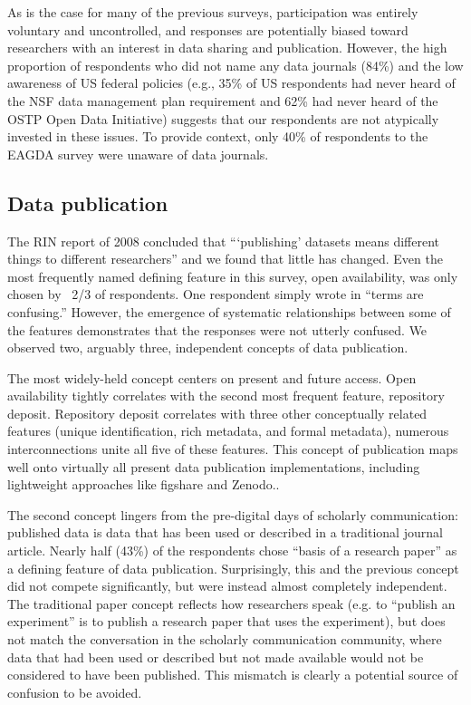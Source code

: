 \documentclass[10pt]{article}
\begin{document}
As is the case for many of the previous surveys, participation was entirely voluntary and uncontrolled, and responses are potentially biased toward researchers with an interest in data sharing and publication.
However, the high proportion of respondents who did not name any data journals (84\%) and the low awareness of US federal policies (e.g., 35\% of US respondents had never heard of the NSF data management plan requirement and 62\% had never heard of the OSTP Open Data Initiative) suggests that our respondents are not atypically invested in these issues.
To provide context, only 40\% of respondents to the EAGDA survey were unaware of data journals.

\subsection*{Data publication}

The RIN report of 2008 concluded that ```publishing' datasets means different things to different researchers''\cite{swan_share_2008} and we found that little has changed.
Even the most frequently named defining feature in this survey, open availability, was only chosen by ~2/3 of respondents.
One respondent simply wrote in ``terms are confusing.''
However, the emergence of systematic relationships between some of the features demonstrates that the responses were not utterly confused.
We observed two, arguably three, independent concepts of data publication.

The most widely-held concept centers on present and future access.
Open availability tightly correlates with the second most frequent feature, repository deposit.
Repository deposit correlates with three other conceptually related features (unique identification, rich metadata, and formal metadata), numerous interconnections unite all five of these features.
This concept of publication maps well onto virtually all present data publication implementations, including lightweight approaches like figshare and Zenodo..

The second concept lingers from the pre-digital days of scholarly communication: published data is data that has been used or described in a traditional journal article. 
Nearly half (43\%) of the respondents chose ``basis of a research paper'' as a defining feature of data publication. 
Surprisingly, this and the previous concept did not compete significantly, but were instead almost completely independent.
The traditional paper concept reflects how researchers speak (e.g. to ``publish an experiment'' is to publish a research paper that uses the experiment), but does not match the conversation in the scholarly communication community, where data that had been used or described but not made available would not be considered to have been published.
This mismatch is clearly a potential source of confusion to be avoided.
\end{document}
